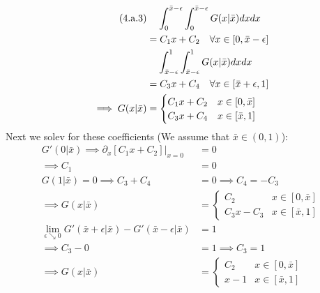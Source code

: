 \documentclass[]{article}
\begin{document}
        \begin{align*}\tag{4.a.3}\label{eqn:4.a.3}
            &\hspace{1.1em}
            \int_{0}^{\bar{x} - \epsilon} \int_{0}^{\bar{x} - \epsilon} 
            G(x|\bar{x}) dxdx
            \\
            &= C_1x + C_2
            \quad \forall x \in [0, \bar{x} - \epsilon]
            \\
            &\hspace{1.1em} 
            \int_{\bar{x} - \epsilon}^{1}
            \int_{\bar{x} - \epsilon}^1
            G(x|\bar{x})dxdx 
            \\
            &= C_3x + C_4
            \quad \forall x \in [\bar{x} + \epsilon, 1]
            \\
            \implies G(x|\bar{x}) &=
            \begin{cases}
                C_1x + C_2 & x\in [0, \bar{x}]
                \\
                C_3x + C_4 & x \in [\bar{x}, 1]
            \end{cases}
        \end{align*}
        Next we solev for these coefficients (We assume that $\bar{x} \in (0, 1)$): 
        \begin{align*}\tag{4.a.4}\label{eqn:4.a.4}
            G'(0|\bar{x}) \implies \partial_x \left.[C_1x + C_2]\right|_{x = 0} &= 
            0
            \\ \implies 
            C_1 &= 0 
            \\
            G(1|\bar{x}) =0 \implies C_3 + C_4 &= 0 \implies C_4 = -C_3
            \\
            \implies 
            G(x|\bar{x}) &= \begin{cases}
                C_2 & x \in [0, \bar{x}]    
                \\
                C_3x - C_3 & x\in [\bar{x}, 1]
            \end{cases}
            \\
            \lim_{\epsilon \searrow 0}
            G'(\bar{x} + \epsilon| \bar{x}) - G'(\bar{x} - \epsilon|\bar{x}) &= 1
            \\
            \implies C_3 - 0 &= 1 \implies C_3 = 1
            \\
            \implies 
            G(x|\bar{x}) &= \begin{cases}
                C_2 & x \in [0, \bar{x}]    
                \\
                x - 1 & x\in [\bar{x}, 1]
            \end{cases}
        \end{align*}
\end{document}
